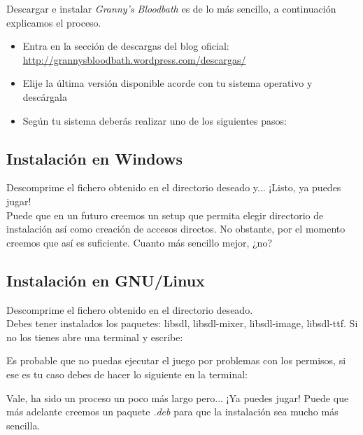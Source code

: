 Descargar e instalar \emph{Granny's Bloodbath} es de lo más sencillo, a continuación explicamos el proceso.

\begin{itemize}
	\item Entra en la sección de descargas del blog oficial:\\
		\href{http://grannysbloodbath.wordpress.com/descargas/}{http://grannysbloodbath.wordpress.com/descargas/}
	\item Elije la última versión disponible acorde con tu sistema operativo y descárgala
	\item Según tu sistema deberás realizar uno de los siguientes pasos:
\end{itemize}

\subsection{Instalación en Windows}
Descomprime el fichero obtenido en el directorio deseado y... ¡Listo, ya puedes jugar!\\

Puede que en un futuro creemos un setup que permita elegir directorio de instalación así como creación de accesos directos. No obstante, por el momento creemos que así es suficiente. Cuanto más sencillo mejor, ¿no?

\subsection{Instalación en GNU/Linux}
Descomprime el fichero obtenido en el directorio deseado.\\

Debes tener instalados los paquetes: libsdl, libsdl-mixer, libsdl-image, libsdl-ttf. Si no los tienes abre una terminal y escribe:



Es probable que no puedas ejecutar el juego por problemas con los permisos, si ese es tu caso debes de hacer lo siguiente en la terminal:



Vale, ha sido un proceso un poco más largo pero... ¡Ya puedes jugar! Puede que más adelante creemos un paquete \emph{.deb} para que la instalación sea mucho más sencilla.
